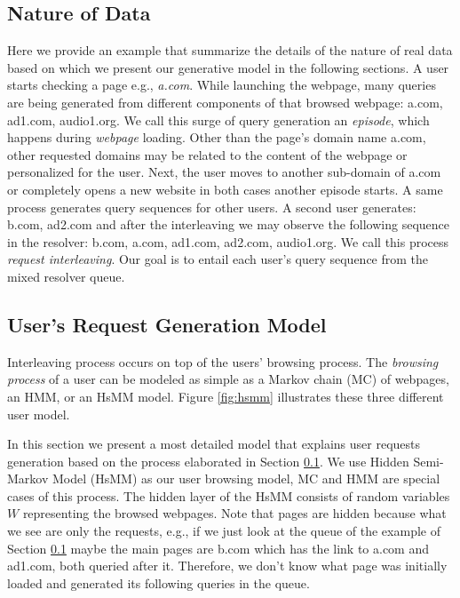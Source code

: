 \documentclass[conference]{IEEEtran}
\begin{document}
	\subsection{Nature of Data}
	\label{subsec:nature}
	Here we provide an example that summarize the details of the nature of real data based on which we present our generative model in the following sections.	
	A user starts checking a page e.g., \emph{a.com}. While launching the webpage, many queries are being generated from different components of that browsed webpage: a.com, ad1.com, audio1.org. 
	We call this surge of query generation an \emph{episode}, which happens during \emph{webpage} loading. 
	Other than the page's domain name a.com, other requested domains may be related to the content of the webpage or personalized for the user. 
	Next, the user moves to another sub-domain of a.com or completely opens a new website in both cases another episode starts. 
	A same process generates query sequences for other users.
	A second user generates: b.com, ad2.com and after the interleaving we may observe the following sequence in the resolver: b.com, a.com, ad1.com, ad2.com, audio1.org.
	We call this process \emph{request interleaving}.
	Our goal is to entail each user's query sequence from the mixed resolver queue. 
	
	\subsection{User's Request Generation Model}
	\label{subsec:user}
	Interleaving process occurs on top of the users' browsing process. 
	The \emph{browsing process} of a user can be modeled as simple as a Markov chain (MC) of webpages, an HMM, or an HsMM model. 
	Figure \ref{fig:hsmm} illustrates these three different user model. 	
	
	In this section we present a most detailed model that explains user requests generation based on the process elaborated in Section \ref{subsec:nature}. 	
	We use Hidden Semi-Markov Model (HsMM) as our user browsing model, MC and HMM are special cases of this process. 
	The hidden layer of the HsMM consists of random variables $W$ representing the browsed webpages.
	Note that pages are hidden because what we see are only the requests, e.g., if we just look at the queue of the example of Section \ref{subsec:nature} maybe the main pages are b.com which has the link to a.com and ad1.com, both queried after it.
	Therefore, we don't know what page was initially loaded and generated its following queries in the queue. 
	
\end{document}
